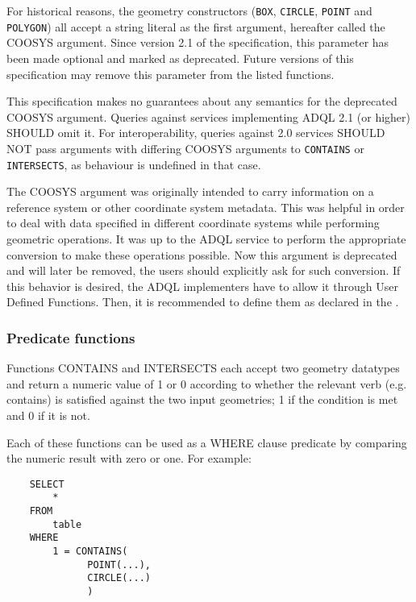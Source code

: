 \documentclass[11pt,a4paper]{ivoa}
\begin{document}
For historical reasons, the geometry constructors (\verb:BOX:, \verb:CIRCLE:,
\verb:POINT: and \verb:POLYGON:) all accept a string literal as the first
argument, hereafter called the COOSYS argument. Since version 2.1 of the
specification, this parameter has been made optional and marked as deprecated.
Future versions of this specification may remove this parameter from the listed
functions.

This specification makes no guarantees about any semantics for the deprecated
COOSYS argument. Queries against services implementing ADQL 2.1 (or higher)
SHOULD omit it. For interoperability, queries against 2.0 services SHOULD NOT
pass arguments with differing COOSYS arguments to \verb:CONTAINS: or
\verb:INTERSECTS:, as behaviour is undefined in that case.

The COOSYS argument was originally intended to carry information on
a reference system or other coordinate system metadata. This was helpful in
order to deal with data specified in different coordinate systems while
performing geometric operations. It was up to the ADQL service to perform
the appropriate conversion to make these operations possible. Now this argument
is deprecated and will later be removed, the users should explicitly ask for
such conversion. If this behavior is desired, the ADQL implementers have to
allow it through User Defined Functions. Then, it is recommended to define them
as declared in the \CatalogueUDF{}.

\subsubsection{Predicate functions}
\label{sec:functions.geom.predicate}

Functions CONTAINS and INTERSECTS each accept two geometry datatypes
and return a numeric value of 1 or 0 according to whether the relevant
verb (e.g. contains) is satisfied against the two input geometries;
1 if the condition is met and 0 if it is not.

Each of these functions can be used as a WHERE clause predicate by
comparing the numeric result with zero or one.
For example:
\begin{verbatim}
    SELECT
        *
    FROM
        table
    WHERE
        1 = CONTAINS(
              POINT(...),
              CIRCLE(...)
              )
\end{verbatim}
\end{document}
